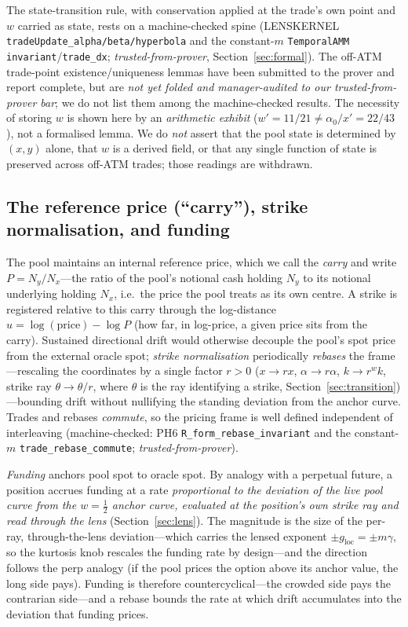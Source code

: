 \documentclass[runningheads]{llncs}
\newcommand{\tfp}{\emph{trusted-from-prover}}
\begin{document}
The state-transition rule, with conservation applied at the trade's own point and
$w$ carried as state, rests on a machine-checked spine (LENSKERNEL
\texttt{tradeUpdate\_alpha/beta/hyperbola} and the constant-$m$ \texttt{TemporalAMM}
\texttt{invariant}/\texttt{trade\_dx}; \tfp{}, Section~\ref{sec:formal}). The
off-ATM trade-point existence/uniqueness lemmas have been submitted to the prover
and report complete, but are \emph{not yet folded and manager-audited to our \tfp{}
bar}; we do not list them among the machine-checked results. The necessity of
storing $w$ is shown here by an \emph{arithmetic exhibit}
($w'=11/21\neq\alpha_0/x'=22/43$), not a formalised lemma. We do
\emph{not} assert that the pool state is determined by $(x,y)$ alone, that $w$ is a
derived field, or that any single function of state is preserved across off-ATM
trades; those readings are withdrawn.

\subsection{The reference price (``carry''), strike normalisation, and funding}
The pool maintains an internal reference price, which we call the \emph{carry} and
write $P=N_{y}/N_{x}$---the ratio of the pool's notional cash holding $N_{y}$ to
its notional underlying holding $N_{x}$, i.e.\ the price the pool treats as its own
centre. A strike is registered relative to this carry through the log-distance
$u=\log(\mathrm{price})-\log P$ (how far, in log-price, a given price sits from the
carry). Sustained directional drift would otherwise decouple the pool's spot price
from the external oracle spot; \emph{strike normalisation} periodically
\emph{rebases} the frame---rescaling the coordinates by a single factor $r>0$
($x\to rx$, $\alpha\to r\alpha$, $k\to r^{w}k$, strike ray $\theta\to\theta/r$,
where $\theta$ is the ray identifying a strike, Section~\ref{sec:transition})---bounding drift
without nullifying the standing deviation from the anchor curve. Trades and rebases \emph{commute}, so the pricing frame is
well defined independent of interleaving (machine-checked: PH6
\texttt{R\_form\_rebase\_invariant} and the constant-$m$
\texttt{trade\_rebase\_commute}; \tfp{}).

\emph{Funding} anchors pool spot to oracle spot. By analogy with a perpetual
future, a position accrues funding at a rate \emph{proportional to the deviation
of the live pool curve from the $w=\tfrac12$ anchor curve, evaluated at the
position's own strike ray and read through the lens} (Section~\ref{sec:lens}). The
magnitude is the size of the per-ray, through-the-lens deviation---which carries
the lensed exponent $\pm g_{\mathrm{loc}}=\pm m\gamma$, so the kurtosis knob
rescales the funding rate by design---and the direction follows the perp analogy
(if the pool prices the option above its anchor value, the long side pays).
Funding is therefore countercyclical---the crowded side pays the contrarian
side---and a rebase bounds the rate at which drift accumulates into the deviation
that funding prices.
\end{document}
